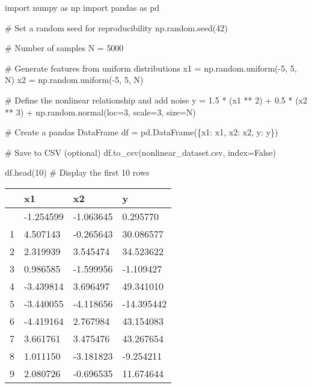 \documentclass[
  letterpaper,
  DIV=11,
  numbers=noendperiod]{scrreprt}
\newenvironment{Shaded}{\begin{snugshade}}{\end{snugshade}}
\newcommand{\CommentTok}[1]{\textcolor[rgb]{0.37,0.37,0.37}{#1}}
\newcommand{\DecValTok}[1]{\textcolor[rgb]{0.68,0.00,0.00}{#1}}
\newcommand{\FloatTok}[1]{\textcolor[rgb]{0.68,0.00,0.00}{#1}}
\newcommand{\ImportTok}[1]{\textcolor[rgb]{0.00,0.46,0.62}{#1}}
\newcommand{\NormalTok}[1]{\textcolor[rgb]{0.00,0.23,0.31}{#1}}
\newcommand{\OperatorTok}[1]{\textcolor[rgb]{0.37,0.37,0.37}{#1}}
\newcommand{\StringTok}[1]{\textcolor[rgb]{0.13,0.47,0.30}{#1}}
\newcommand{\VariableTok}[1]{\textcolor[rgb]{0.07,0.07,0.07}{#1}}
\begin{document}
\begin{Shaded}
\begin{Highlighting}[]
\ImportTok{import}\NormalTok{ numpy }\ImportTok{as}\NormalTok{ np}
\ImportTok{import}\NormalTok{ pandas }\ImportTok{as}\NormalTok{ pd}

\CommentTok{\# Set a random seed for reproducibility}
\NormalTok{np.random.seed(}\DecValTok{42}\NormalTok{)}

\CommentTok{\# Number of samples}
\NormalTok{N }\OperatorTok{=} \DecValTok{5000}

\CommentTok{\# Generate features from uniform distributions}
\NormalTok{x1 }\OperatorTok{=}\NormalTok{ np.random.uniform(}\OperatorTok{{-}}\DecValTok{5}\NormalTok{, }\DecValTok{5}\NormalTok{, N)}
\NormalTok{x2 }\OperatorTok{=}\NormalTok{ np.random.uniform(}\OperatorTok{{-}}\DecValTok{5}\NormalTok{, }\DecValTok{5}\NormalTok{, N)}

\CommentTok{\# Define the nonlinear relationship and add noise}
\NormalTok{y }\OperatorTok{=} \FloatTok{1.5} \OperatorTok{*}\NormalTok{ (x1 }\OperatorTok{**} \DecValTok{2}\NormalTok{) }\OperatorTok{+} \FloatTok{0.5} \OperatorTok{*}\NormalTok{ (x2 }\OperatorTok{**} \DecValTok{3}\NormalTok{) }\OperatorTok{+}\NormalTok{ np.random.normal(loc}\OperatorTok{=}\DecValTok{3}\NormalTok{, scale}\OperatorTok{=}\DecValTok{3}\NormalTok{, size}\OperatorTok{=}\NormalTok{N)}

\CommentTok{\# Create a pandas DataFrame}
\NormalTok{df }\OperatorTok{=}\NormalTok{ pd.DataFrame(\{}\StringTok{\textquotesingle{}x1\textquotesingle{}}\NormalTok{: x1, }\StringTok{\textquotesingle{}x2\textquotesingle{}}\NormalTok{: x2, }\StringTok{\textquotesingle{}y\textquotesingle{}}\NormalTok{: y\})}

\CommentTok{\# Save to CSV (optional)}
\NormalTok{df.to\_csv(}\StringTok{\textquotesingle{}nonlinear\_dataset.csv\textquotesingle{}}\NormalTok{, index}\OperatorTok{=}\VariableTok{False}\NormalTok{)}

\NormalTok{df.head(}\DecValTok{10}\NormalTok{)  }\CommentTok{\# Display the first 10 rows}
\end{Highlighting}
\end{Shaded}

\begin{longtable}[]{@{}llll@{}}
\toprule\noalign{}
& x1 & x2 & y \\
\midrule\noalign{}
\endhead
\bottomrule\noalign{}
\endlastfoot
0 & -1.254599 & -1.063645 & 0.295770 \\
1 & 4.507143 & -0.265643 & 30.086577 \\
2 & 2.319939 & 3.545474 & 34.523622 \\
3 & 0.986585 & -1.599956 & -1.109427 \\
4 & -3.439814 & 3.696497 & 49.341010 \\
5 & -3.440055 & -4.118656 & -14.395442 \\
6 & -4.419164 & 2.767984 & 43.154083 \\
7 & 3.661761 & 3.475476 & 43.267654 \\
8 & 1.011150 & -3.181823 & -9.254211 \\
9 & 2.080726 & -0.696535 & 11.674644 \\
\end{longtable}
\end{document}
